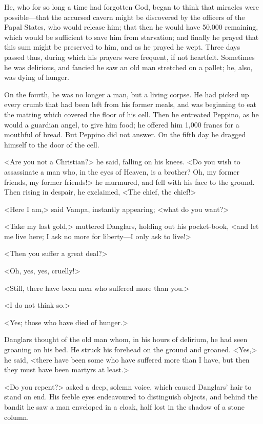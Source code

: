  He, who for so long a time had forgotten God, began to think that miracles were possible—that the accursed cavern might be discovered by the officers of the Papal States, who would release him; that then he would have 50,000 remaining, which would be sufficient to save him from starvation; and finally he prayed that this sum might be preserved to him, and as he prayed he wept. Three days passed thus, during which his prayers were frequent, if not heartfelt. Sometimes he was delirious, and fancied he saw an old man stretched on a pallet; he, also, was dying of hunger. 

 On the fourth, he was no longer a man, but a living corpse. He had picked up every crumb that had been left from his former meals, and was beginning to eat the matting which covered the floor of his cell. Then he entreated Peppino, as he would a guardian angel, to give him food; he offered him 1,000 francs for a mouthful of bread. But Peppino did not answer. On the fifth day he dragged himself to the door of the cell. 

 <Are you not a Christian?> he said, falling on his knees. <Do you wish to assassinate a man who, in the eyes of Heaven, is a brother? Oh, my former friends, my former friends!> he murmured, and fell with his face to the ground. Then rising in despair, he exclaimed, <The chief, the chief!> 

 <Here I am,> said Vampa, instantly appearing; <what do you want?> 

 <Take my last gold,> muttered Danglars, holding out his pocket-book, <and let me live here; I ask no more for liberty—I only ask to live!> 

 <Then you suffer a great deal?> 

 <Oh, yes, yes, cruelly!> 

 <Still, there have been men who suffered more than you.> 

 <I do not think so.> 

 <Yes; those who have died of hunger.> 

 Danglars thought of the old man whom, in his hours of delirium, he had seen groaning on his bed. He struck his forehead on the ground and groaned. <Yes,> he said, <there have been some who have suffered more than I have, but then they must have been martyrs at least.> 

 <Do you repent?> asked a deep, solemn voice, which caused Danglars' hair to stand on end. His feeble eyes endeavoured to distinguish objects, and behind the bandit he saw a man enveloped in a cloak, half lost in the shadow of a stone column. 

